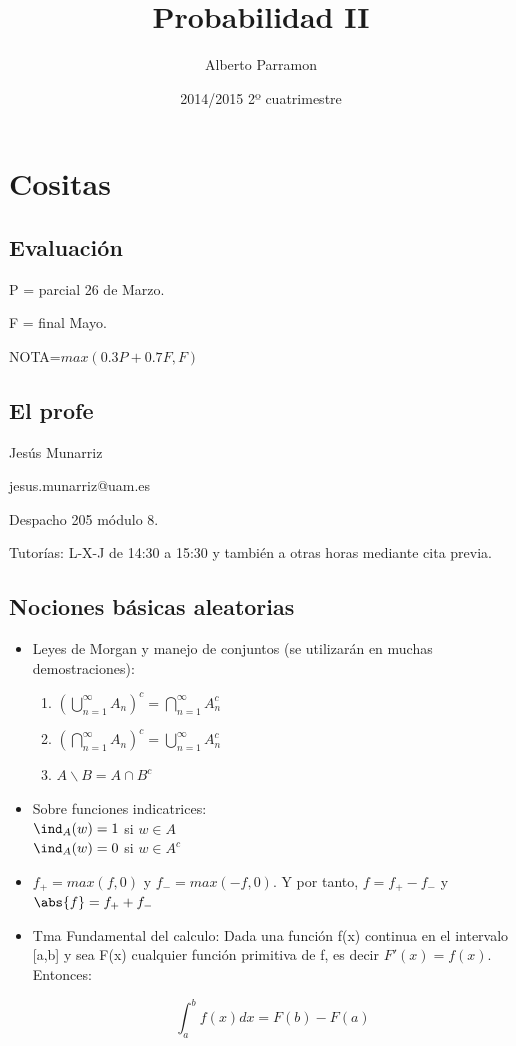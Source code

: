 \documentclass{apuntes}
\author{Alberto Parramon}
\date{2014/2015 2º cuatrimestre}
\title{Probabilidad II}
\begin{document}
\pagestyle{plain}
\maketitle

\tableofcontents
\newpage
\chapter{Cositas}


\section{Evaluación}
P = parcial 26 de Marzo.

F = final Mayo.

NOTA=$max(0.3P+0.7F,F)$ 

\section{El profe}
Jesús Munarriz

jesus.munarriz@uam.es

Despacho 205 módulo 8.

Tutorías: L-X-J de 14:30 a 15:30 y también a otras horas mediante cita previa.

\section{Nociones básicas aleatorias}
\begin{itemize}
\item Leyes de Morgan y manejo de conjuntos (se utilizarán en muchas demostraciones):
\begin{enumerate}
\item $(\bigcup_{n=1}^{\infty}A_n)^c = \bigcap_{n=1}^{\infty}A_n^c$
\item $(\bigcap_{n=1}^{\infty}A_n)^c = \bigcup_{n=1}^{\infty}A_n^c$
\item $A \backslash B = A \cap B^c$

\end{enumerate}
\item Sobre funciones indicatrices:\\
$\ind_A(w)=1$ si $w \in A$\\
$\ind_A(w)=0$ si $w \in A^c$

\item $f_+ = max(f,0)$ y $f_- = max(-f,0)$. Y por tanto, $f=f_+ -f_-$ y $\abs{f}=f_+ +f_-$

\item Tma Fundamental del calculo: Dada una función f(x) continua en el intervalo [a,b] y sea F(x) cualquier función primitiva de f, es decir $F '(x) = f(x)$. Entonces:

\[
\int_a^b f(x)dx = F(b)-F(a)
\]
\end{itemize}
\end{document}
